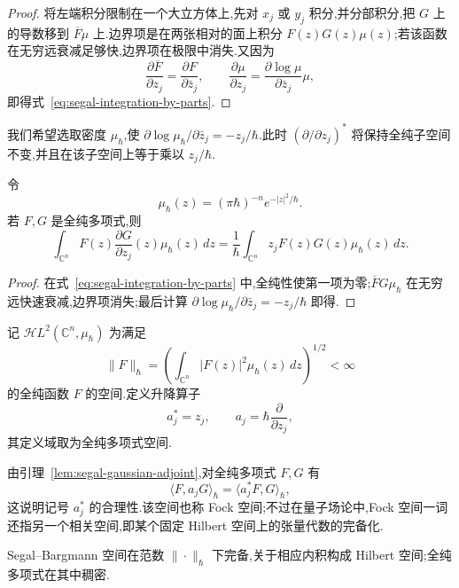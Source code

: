 \begin{proof}
将左端积分限制在一个大立方体上,先对 $x_j$ 或 $y_j$ 积分,并分部积分,把 $G$ 上的导数移到 $\overline F\mu$ 上.边界项是在两张相对的面上积分 $F(z)G(z)\mu(z)$;若该函数在无穷远衰减足够快,边界项在极限中消失.又因为
\[
\frac{\partial\overline F}{\partial z_j}=\frac{\partial F}{\partial\bar z_j},
\qquad
\frac{\partial\mu}{\partial z_j}=\frac{\partial\log\mu}{\partial\bar z_j}\mu,
\]
即得式~\eqref{eq:segal-integration-by-parts}.
\end{proof}

我们希望选取密度 $\mu_\hbar$,使 $\partial\log\mu_\hbar/\partial\bar z_j=-z_j/\hbar$.此时 $(\partial/\partial z_j)^*$ 将保持全纯子空间不变,并且在该子空间上等于乘以 $z_j/\hbar$.

\begin{lemma}\label{lem:segal-gaussian-adjoint}
令
\[
\mu_\hbar(z)=(\pi\hbar)^{-n}e^{-|z|^2/\hbar}.
\]
若 $F,G$ 是全纯多项式,则
\[
\int_{\mathbb C^n}F(z)\frac{\partial G}{\partial z_j}(z)\mu_\hbar(z)\,dz
=\frac1\hbar\int_{\mathbb C^n}z_jF(z)G(z)\mu_\hbar(z)\,dz.
\label{eq:segal-gaussian-adjoint}
\]
\end{lemma}

\begin{proof}
在式~\eqref{eq:segal-integration-by-parts} 中,全纯性使第一项为零;$\overline F G\mu_\hbar$ 在无穷远快速衰减,边界项消失;最后计算 $\partial\log\mu_\hbar/\partial\bar z_j=-z_j/\hbar$ 即得.
\end{proof}

\begin{definition}\label{def:segal-bargmann-space}
记 $\mathcal H L^2(\mathbb C^n,\mu_\hbar)$ 为满足
\[
\|F\|_\hbar=\left(\int_{\mathbb C^n}|F(z)|^2\mu_\hbar(z)\,dz\right)^{1/2}<\infty
\]
的全纯函数 $F$ 的空间.定义升降算子
\[
a_j^*=z_j,
\qquad
a_j=\hbar\frac{\partial}{\partial z_j},
\]
其定义域取为全纯多项式空间.
\end{definition}

由引理~\ref{lem:segal-gaussian-adjoint},对全纯多项式 $F,G$ 有
\[
\langle F,a_jG\rangle_\hbar=\langle a_j^*F,G\rangle_\hbar,
\]
这说明记号 $a_j^*$ 的合理性.该空间也称 Fock 空间;不过在量子场论中,Fock 空间一词还指另一个相关空间,即某个固定 Hilbert 空间上的张量代数的完备化.

\begin{proposition}\label{prop:segal-bargmann-complete}
Segal--Bargmann 空间在范数 $\|\cdot\|_\hbar$ 下完备,关于相应内积构成 Hilbert 空间;全纯多项式在其中稠密.
\end{proposition}

